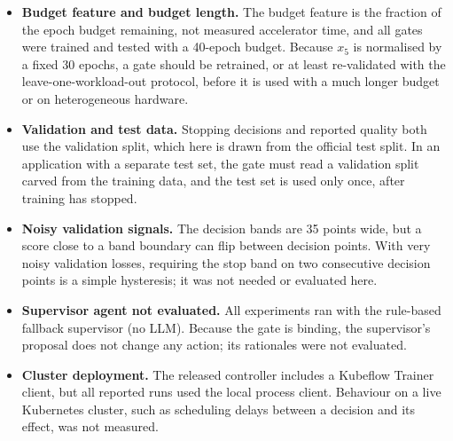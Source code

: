 \begin{itemize}
\item \textbf{Budget feature and budget length.} The budget feature is the fraction of the epoch budget remaining, not measured accelerator time, and all gates were trained and tested with a 40-epoch budget. Because $x_5$ is normalised by a fixed 30 epochs, a gate should be retrained, or at least re-validated with the leave-one-workload-out protocol, before it is used with a much longer budget or on heterogeneous hardware.
\item \textbf{Validation and test data.} Stopping decisions and reported quality both use the validation split, which here is drawn from the official test split. In an application with a separate test set, the gate must read a validation split carved from the training data, and the test set is used only once, after training has stopped.
\item \textbf{Noisy validation signals.} The decision bands are 35 points wide, but a score close to a band boundary can flip between decision points. With very noisy validation losses, requiring the stop band on two consecutive decision points is a simple hysteresis; it was not needed or evaluated here.
\item \textbf{Supervisor agent not evaluated.} All experiments ran with the rule-based fallback supervisor (no LLM). Because the gate is binding, the supervisor's proposal does not change any action; its rationales were not evaluated.
\item \textbf{Cluster deployment.} The released controller includes a Kubeflow Trainer client, but all reported runs used the local process client. Behaviour on a live Kubernetes cluster, such as scheduling delays between a decision and its effect, was not measured.
\end{itemize}
